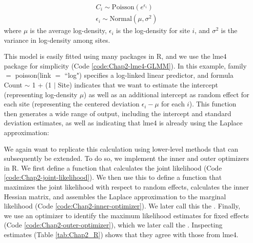 \begin{equation} \label{eq:Chap2_GLMM}
\begin{gathered}
    C_i \sim \mathrm{Poisson}( e^{\epsilon_i} ) \\ 
    \epsilon_i \sim \mathrm{Normal}( \mu, \sigma^2 ) 
\end{gathered}
\end{equation}
where \(\mu\) is the average log-density, \(\epsilon_i\) is the log-density for site \(i\), and \(\sigma^2\) is the variance in log-density among sites.  

\lstset{style=Rcode}


This model is easily fitted using many packages in R, and we use the \colorbox{backcolour}{lme4} package for simplicity \cite{bates_fitting_2015} (Code \ref{code:Chap2-lme4-GLMM}).  In this example, \colorbox{backcolour}{family $=$ poisson(link $=$ ``log")} specifies a log-linked linear predictor, and formula \colorbox{backcolour}{Count $\sim$ 1 + (1 $\vert$ Site)} indicates that we want to estimate the intercept (representing log-density \(\mu\)) as well as an additional intercept as random effect for each site (representing the centered deviation \(\epsilon_i-\mu\) for each \(i\)).  This function then generates a wide range of output, including the intercept and standard deviation estimates, as well as indicating that \colorbox{backcolour}{lme4} is already using the Laplace approximation:

%
\lstset{style=Routput}


\lstset{style=Rcode}


We again want to replicate this calculation using lower-level methods that can subsequently be extended.  To do so, we implement the inner and outer optimizers in R.  We first define a function that calculates the joint likelihood (Code \ref{code:Chap2-joint-likelihood}). We then use this to define a function that maximizes the joint likelihood with respect to random effects, calculates the inner Hessian matrix, and assembles the Laplace approximation to the marginal likelihood (Code \ref{code:Chap2-inner-optimizer}).  We later call this the .  Finally, we use an optimizer to identify the maximum likelihood estimates for fixed effects (Code \ref{code:Chap2-outer-optimizer}), which we later call the .  Inspecting estimates (Table \ref{tab:Chap2_R}) shows that they agree with those from \colorbox{backcolour}{lme4}.  

